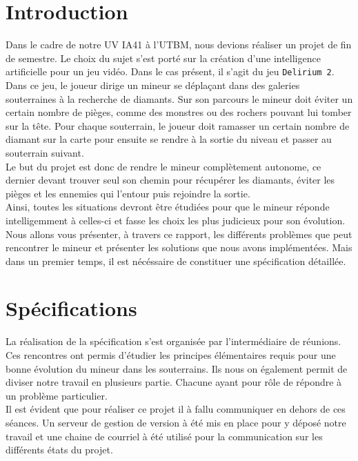 \documentclass[a4paper,11pt]{article}
\begin{document}
	\section{Introduction}
	
Dans le cadre de notre UV IA41 à l'UTBM, nous devions réaliser un projet de fin de semestre. Le choix du sujet s’est porté sur la création d'une intelligence artificielle pour un jeu vidéo. 
Dans le cas présent, il s’agit du jeu \texttt{Delirium 2}. Dans ce jeu, le joueur dirige un mineur se déplaçant dans des galeries souterraines à la recherche de diamants. Sur son parcours le mineur doit éviter un certain nombre de pièges, comme des monstres ou des rochers pouvant lui tomber sur la tête. Pour chaque souterrain, le joueur doit ramasser un certain nombre de diamant sur la carte pour ensuite se rendre à la sortie du niveau et passer au souterrain suivant.\\

Le but du projet est donc de rendre le mineur complètement autonome, ce dernier devant trouver seul son chemin pour récupérer les diamants, éviter les pièges et les ennemies qui l’entour puis rejoindre la sortie.\\

Ainsi, toutes les situations devront être étudiées pour que le mineur réponde intelligemment à celles-ci et fasse les choix les plus judicieux pour son évolution.\\

Nous allons vous présenter, à travers ce rapport, les différents problèmes que peut rencontrer le mineur et présenter les solutions que nous avons implémentées. Mais dans un premier temps, il est nécéssaire de constituer une spécification détaillée.
	
	\newpage
	\section{Spécifications}
	
La réalisation de la spécification s’est organisée par l’intermédiaire de réunions. Ces rencontres ont permis d'étudier les principes élémentaires requis pour une bonne évolution du mineur dans les souterrains. Ils nous on également permit de diviser notre travail en plusieurs partie. Chacune ayant pour rôle de répondre à un problème particulier.\\

Il est évident que pour réaliser ce projet il à fallu communiquer en dehors de ces séances. Un serveur de gestion de version à  été mis en place pour y déposé notre travail et une chaine de courriel à été utilisé pour la communication sur les différents états du projet.
\end{document}
